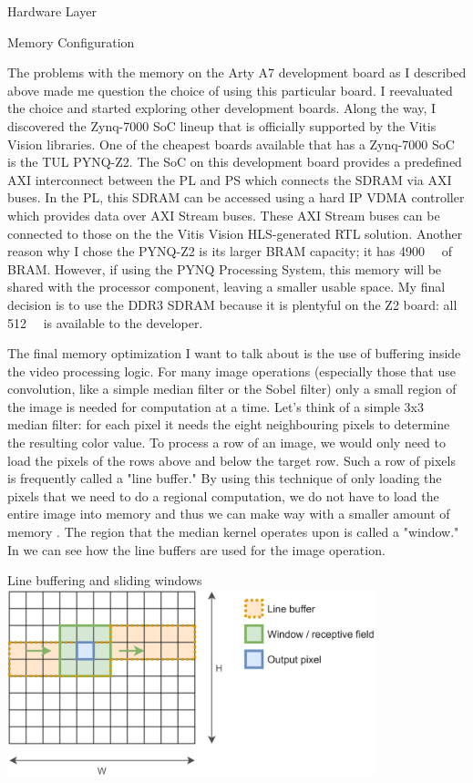 \documentclass{matthijs}
\begin{document}
\begin{hoofdstuk}{Hardware Layer}
\begin{paragraaf}{Memory Configuration}
			\bigskip

			The problems with the memory on the Arty A7 development board as I described above made me question the choice of using this particular board.
			I reevaluated the choice and started exploring other development boards.
			Along the way, I discovered the Zynq-7000 SoC lineup that is officially supported by the Vitis Vision libraries.
			One of the cheapest boards available that has a Zynq-7000 SoC is the TUL PYNQ-Z2.
			The SoC on this development board provides a predefined AXI interconnect between the PL and PS which connects the SDRAM via AXI buses.
			In the PL, this SDRAM can be accessed using a hard IP VDMA controller which provides data over AXI Stream buses.
			These AXI Stream buses can be connected to those on the the Vitis Vision HLS-generated RTL solution.
			Another reason why I chose the PYNQ-Z2 is its larger BRAM capacity; it has \qty{4900}{\kibi\bit} of BRAM.
			However, if using the PYNQ Processing System, this memory will be shared with the processor component, leaving a smaller usable space.
			My final decision is to use the DDR3 SDRAM because it is plentyful on the Z2 board: all \qty{512}{\mega\byte} is available to the developer.

			\bigskip

			The final memory optimization I want to talk about is the use of buffering inside the video processing logic.
			For many image operations (especially those that use convolution, like a simple median filter or the Sobel filter) only a small region of the image is needed for computation at a time.
			Let's think of a simple 3x3 median filter: for each pixel it needs the eight neighbouring pixels to determine the resulting color value.
			To process a row of an image, we would only need to load the pixels of the rows above and below the target row.
			Such a row of pixels is frequently called a "line buffer."
			By using this technique of only loading the pixels that we need to do a regional computation, we do not have to load the entire image into memory and thus we can make way with a smaller amount of memory \cite{hoorick2019convolution}.
			The region that the median kernel operates upon is called a "window."
			In  we can see how the line buffers are used for the image operation.
			
			\begin{figuur}{Line buffering and sliding windows}
				\includegraphics[width=0.8\textwidth]{hoorick2019-convolutions.png}
				\cite{hoorick2019convolution}
			\end{figuur}


\end{paragraaf}
\end{hoofdstuk}
\end{document}
